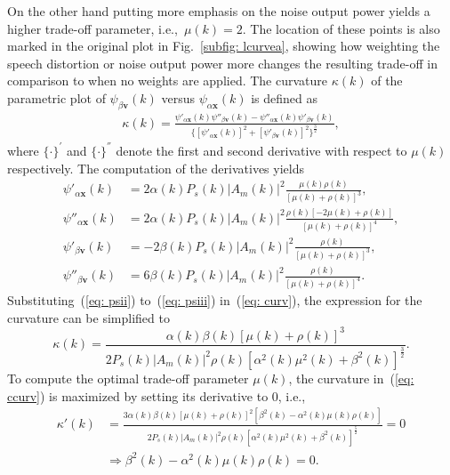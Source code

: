 \documentclass{article}
\begin{document}
On the other hand putting more emphasis on the noise output power yields a higher trade-off parameter, i.e.,~$\mu(k) = 2$.
The location of these points is also marked in the original plot in Fig.~\ref{subfig: lcurvea}, showing how weighting the speech distortion or noise output power more changes the resulting trade-off in comparison to when no weights are applied. \newline
The curvature $\kappa(k)$ of the parametric plot of $\psi_{\beta \mathbf{v}}(k)$ versus $\psi_{\alpha \mathbf{x}}(k)$ is defined as~\cite{Sternberg_book_2012}
\begin{align}
  \label{eq: curv}
  \kappa(k) = \frac{ \psi'_{\alpha\mathbf{x}}(k) \psi''_{\beta\mathbf{v}}(k) - \psi''_{\alpha\mathbf{x}}(k) \psi'_{\beta\mathbf{v}}(k)}{\{[\psi'_{\alpha \mathbf{x}}(k)]^{2} + [\psi'_{\beta\mathbf{v}}(k)]^{2}\}^{\frac{3}{2}}},
\end{align}
where $\{ \cdot \}^{'}$ and $\{ \cdot \}^{''}$ denote the first and second derivative with respect to $\mu(k)$ respectively.
The computation of the derivatives yields
\begin{align}
  \label{eq: psii}
  \psi'_{\alpha\mathbf{x}}(k) &= 2 \alpha(k) P_s(k)|A_m(k)|^2  \frac{\mu(k) \rho(k)}{[\mu(k)+\rho(k)]^3}, \\
  \psi''_{\alpha\mathbf{x}}(k) &= 2  \alpha(k) P_s(k)|A_m(k)|^2  \frac{\rho(k)[-2\mu(k)+\rho(k)]}{[\mu(k)+\rho(k)]^4}, \\
  \psi'_{\beta\mathbf{v}}(k) &= -2 \beta(k) P_s(k)|A_m(k)|^2  \frac{\rho(k)}{[\mu(k)+\rho(k)]^3}, \\
  \label{eq: psiii}
  \psi''_{\beta\mathbf{v}}(k) &= 6 \beta(k) P_s(k)|A_m(k)|^2  \frac{\rho(k)}{[\mu(k)+\rho(k)]^4}.
\end{align}
Substituting~(\ref{eq: psii}) to~(\ref{eq: psiii}) in~(\ref{eq: curv}), the expression for the curvature can be simplified to
\begin{equation}
  \label{eq: ccurv}
  \kappa(k) = \frac{\alpha(k)\beta(k) [\mu(k) + \rho(k)]^3}{2 P_s(k) |A_m(k)|^2 \rho(k) [\alpha^2(k) \mu^2(k) + \beta^2(k)]^{\frac{3}{2}}}.
\end{equation}
To compute the optimal trade-off parameter $\mu(k)$, the curvature in~(\ref{eq: ccurv}) is maximized by setting its derivative to $0$, i.e.,
\begin{align}
  \kappa'(k) \!&\! =\! \frac{3\alpha(k)\beta(k)[\mu(k)\!+\!\rho(k)]^2 [\beta^2(k)\!-\! \alpha^2(k)\mu(k) \rho(k)]}{2 P_s(k)|A_m(k)|^2\rho(k) [\alpha^2(k) \mu^2(k) \!+\! \beta^2(k)]^{\frac{5}{2}}}  \! =\! 0 \nonumber \\ 
  \label{eq: opteq}
  & \Rightarrow \beta^2(k) - \alpha^2(k)\mu(k) \rho(k) = 0.
\end{align}
\end{document}
